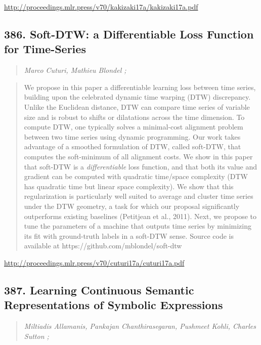 \documentclass{article}
\begin{document}
\href{http://proceedings.mlr.press/v70/kakizaki17a/kakizaki17a.pdf}{http://proceedings.mlr.press/v70/kakizaki17a/kakizaki17a.pdf}

\subsection{386. Soft-DTW: a Differentiable Loss Function for Time-Series}

\begin{quote}
\footnotesize{\textit{Marco Cuturi, Mathieu Blondel ;}}

\end{quote}

\begin{quote}
    We propose in this paper a differentiable learning loss between time series, building upon the celebrated dynamic time warping (DTW) discrepancy. Unlike the Euclidean distance, DTW can compare time series of variable size and is robust to shifts or dilatations across the time dimension. To compute DTW, one typically solves a minimal-cost alignment problem between two time series using dynamic programming. Our work takes advantage of a smoothed formulation of DTW, called soft-DTW, that computes the soft-minimum of all alignment costs. We show in this paper that soft-DTW is a \textit{differentiable} loss function, and that both its value and gradient can be computed with quadratic time/space complexity (DTW has quadratic time but linear space complexity). We show that this regularization is particularly well suited to average and cluster time series under the DTW geometry, a task for which our proposal significantly outperforms existing baselines (Petitjean et al., 2011). Next, we propose to tune the parameters of a machine that outputs time series by minimizing its fit with ground-truth labels in a soft-DTW sense. Source code is available at https://github.com/mblondel/soft-dtw  
\end{quote}

\href{http://proceedings.mlr.press/v70/cuturi17a/cuturi17a.pdf}{http://proceedings.mlr.press/v70/cuturi17a/cuturi17a.pdf}

\subsection{387. Learning Continuous Semantic Representations of Symbolic Expressions}

\begin{quote}
\footnotesize{\textit{Miltiadis Allamanis, Pankajan Chanthirasegaran, Pushmeet Kohli, Charles Sutton ;}}

\end{quote}
\end{document}
